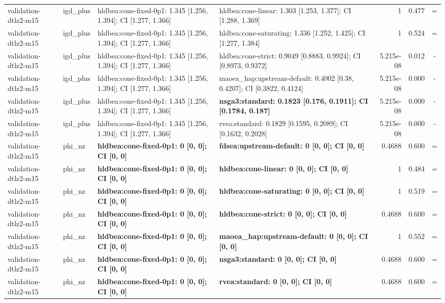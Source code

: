\begin{tabular}{llllrrc}
validation-dtlz2-m15 & igd\_plus & hldbea:cone-fixed-0p1: 1.345 [1.256, 1.394]; CI [1.277, 1.366] & hldbea:cone-linear: 1.303 [1.253, 1.377]; CI [1.288, 1.369] & 1 & 0.477 & = \\
validation-dtlz2-m15 & igd\_plus & hldbea:cone-fixed-0p1: 1.345 [1.256, 1.394]; CI [1.277, 1.366] & hldbea:cone-saturating: 1.336 [1.252, 1.425]; CI [1.277, 1.384] & 1 & 0.524 & = \\
validation-dtlz2-m15 & igd\_plus & hldbea:cone-fixed-0p1: 1.345 [1.256, 1.394]; CI [1.277, 1.366] & hldbea:cone-strict: 0.9049 [0.8883, 0.9924]; CI [0.8973, 0.9372] & 5.215e-08 & 0.012 & - \\
validation-dtlz2-m15 & igd\_plus & hldbea:cone-fixed-0p1: 1.345 [1.256, 1.394]; CI [1.277, 1.366] & maoea\_hap:upstream-default: 0.4002 [0.38, 0.4207]; CI [0.3822, 0.4124] & 5.215e-08 & 0.000 & - \\
validation-dtlz2-m15 & igd\_plus & hldbea:cone-fixed-0p1: 1.345 [1.256, 1.394]; CI [1.277, 1.366] & \textbf{nsga3:standard: 0.1823 [0.176, 0.1911]; CI [0.1784, 0.187]} & 5.215e-08 & 0.000 & - \\
validation-dtlz2-m15 & igd\_plus & hldbea:cone-fixed-0p1: 1.345 [1.256, 1.394]; CI [1.277, 1.366] & rvea:standard: 0.1829 [0.1595, 0.2089]; CI [0.1632, 0.2028] & 5.215e-08 & 0.000 & - \\
validation-dtlz2-m15 & phi\_nz & \textbf{hldbea:cone-fixed-0p1: 0 [0, 0]; CI [0, 0]} & \textbf{fdsea:upstream-default: 0 [0, 0]; CI [0, 0]} & 0.4688 & 0.600 & = \\
validation-dtlz2-m15 & phi\_nz & \textbf{hldbea:cone-fixed-0p1: 0 [0, 0]; CI [0, 0]} & \textbf{hldbea:cone-linear: 0 [0, 0]; CI [0, 0]} & 1 & 0.484 & = \\
validation-dtlz2-m15 & phi\_nz & \textbf{hldbea:cone-fixed-0p1: 0 [0, 0]; CI [0, 0]} & \textbf{hldbea:cone-saturating: 0 [0, 0]; CI [0, 0]} & 1 & 0.519 & = \\
validation-dtlz2-m15 & phi\_nz & \textbf{hldbea:cone-fixed-0p1: 0 [0, 0]; CI [0, 0]} & \textbf{hldbea:cone-strict: 0 [0, 0]; CI [0, 0]} & 0.4688 & 0.600 & = \\
validation-dtlz2-m15 & phi\_nz & \textbf{hldbea:cone-fixed-0p1: 0 [0, 0]; CI [0, 0]} & \textbf{maoea\_hap:upstream-default: 0 [0, 0]; CI [0, 0]} & 1 & 0.552 & = \\
validation-dtlz2-m15 & phi\_nz & \textbf{hldbea:cone-fixed-0p1: 0 [0, 0]; CI [0, 0]} & \textbf{nsga3:standard: 0 [0, 0]; CI [0, 0]} & 0.4688 & 0.600 & = \\
validation-dtlz2-m15 & phi\_nz & \textbf{hldbea:cone-fixed-0p1: 0 [0, 0]; CI [0, 0]} & \textbf{rvea:standard: 0 [0, 0]; CI [0, 0]} & 0.4688 & 0.600 & = \\

\end{tabular}
